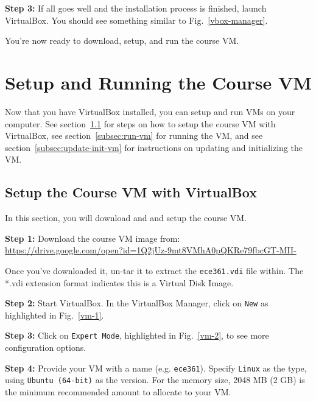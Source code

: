 \documentclass[11pt]{article}
\begin{document}
\textbf{Step 3:} If all goes well and the installation process is finished, launch VirtualBox. You should see something similar to Fig.~\ref{vbox-manager}.

You're now ready to download, setup, and run the course VM.

\section{Setup and Running the Course VM}
\label{sec:setup-run-vm}
Now that you have VirtualBox installed, you can setup and run VMs on your computer. See section~\ref{subsec:setup-vm} for steps on how to setup the course VM with VirtualBox, see section~\ref{subsec:run-vm} for running the VM, and see section~\ref{subsec:update-init-vm} for instructions on updating and initializing the VM.

\subsection{Setup the Course VM with VirtualBox}
\label{subsec:setup-vm}
In this section, you will download and and setup the course VM.

\textbf{Step 1:} Download the course VM image from:\\
\url{https://drive.google.com/open?id=1Q2jUz-9mt8VMhA0pQKRe79fbcGT-MII-}

\noindent Once you've downloaded it, un-tar it to extract the \texttt{ece361.vdi} file within. The *.vdi extension format indicates this is a Virtual Disk Image.

\textbf{Step 2:} Start VirtualBox. In the VirtualBox Manager, click on \texttt{New} as highlighted in Fig.~\ref{vm-1}.

\textbf{Step 3:} Click on \texttt{Expert Mode}, highlighted in Fig.~\ref{vm-2}, to see more configuration options.

\textbf{Step 4:} Provide your VM with a name (e.g. \texttt{ece361}). Specify \texttt{Linux} as the type, using \texttt{Ubuntu (64-bit)} as the version. For the memory size, 2048 MB (2 GB) is the minimum recommended amount to allocate to your VM.
\end{document}
